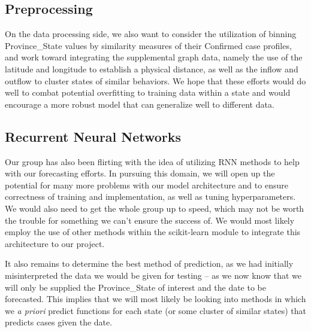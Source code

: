 \documentclass[sigconf]{acmart}
\begin{document}
\subsection{Preprocessing}

On the data processing side, we also want to consider the utilization of
binning Province\_State values by similarity measures of their Confirmed case
profiles, and work toward integrating the supplemental graph data, namely the
use of the latitude and longitude to establish a physical distance, as well as
the inflow and outflow to cluster states of similar behaviors. We hope that
these efforts would do well to combat potential overfitting to training data
within a state and would encourage a more robust model that can generalize well
to different data.

\subsection{Recurrent Neural Networks}

Our group has also been flirting with the idea of utilizing RNN methods to help
with our forecasting efforts. In pursuing this domain, we will open up the
potential for many more problems with our model architecture and to ensure
correctness of training and implementation, as well as tuning hyperparameters.
We would also need to get the whole group up to speed, which may not be worth
the trouble for something we can’t ensure the success of. We would most likely
employ the use of other methods within the scikit-learn module to integrate
this architecture to our project.
 
It also remains to determine the best method of prediction, as we had initially
misinterpreted the data we would be given for testing – as we now know that we
will only be supplied the Province\_State of interest and the date to be
forecasted. This implies that we will most likely be looking into methods in
which we \emph{a priori} predict functions for each state (or some cluster of
similar states) that predicts cases given the date.




\end{document}
